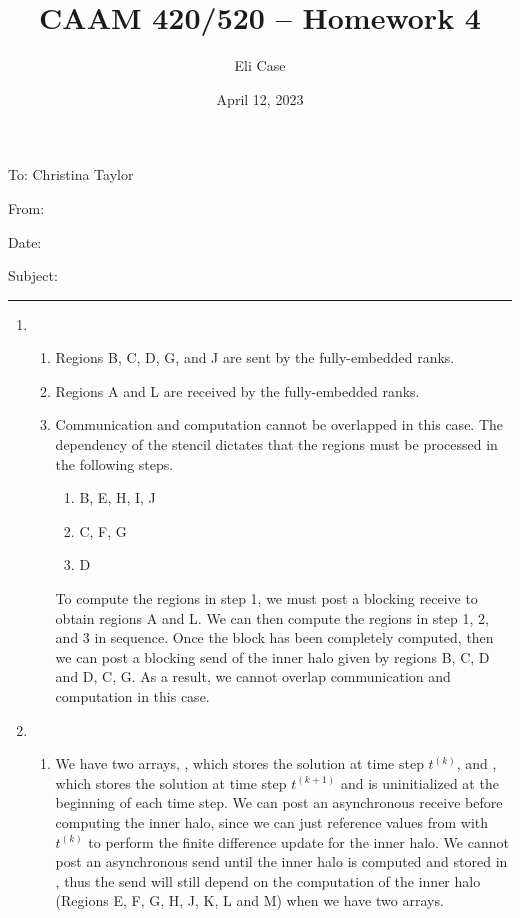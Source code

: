 \documentclass[11pt]{article}
\author{Eli Case}
\title{CAAM 420/520 -- Homework 4}
\date{April 12, 2023}
\begin{document}
\flushleft
\thispagestyle{plain}
To: Christina Taylor

From: \@author

Date: \@date

Subject: \@title

\makeatother
\medskip
\hrule
\medskip

\begin{enumerate}[leftmargin=0.9in]
\item %

   \begin{enumerate}[leftmargin=0.3in]
      \item Regions B, C, D, G, and J are sent by the fully-embedded ranks.
      \item Regions A and L are received by the fully-embedded ranks.
      \item Communication and computation cannot be overlapped in this case. The dependency of the stencil dictates that the regions must be processed in the following steps.
          \begin{enumerate}
              \item B, E, H, I, J
              \item C, F, G
              \item D
          \end{enumerate}
          To compute the regions in step 1, we must post a blocking receive to obtain regions A and L. We can then compute the regions in step 1, 2, and 3 in sequence. Once the block has been completely computed, then we can post a blocking send of the inner halo given by regions B, C, D and D, C, G. As a result, we cannot overlap communication and computation in this case.
   \end{enumerate} %

\item %
   \begin{enumerate}[leftmargin=0.3in]
       
       \item We have two arrays, , which stores the solution at time step $t^{(k)}$, and , which stores the solution at time step $t^{(k+1)}$ and is uninitialized at the beginning of each time step. We can post an asynchronous receive before computing the inner halo, since we can just reference values from  with $t^{(k)}$ to perform the finite difference update for the inner halo. We cannot post an asynchronous send until the inner halo is computed and stored in , thus the send will still depend on the computation of the inner halo (Regions E, F, G, H, J, K, L and M) when we have two arrays.


\end{enumerate}
\end{enumerate}
\end{document}
